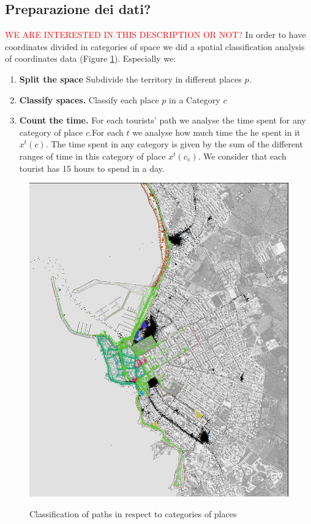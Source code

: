 \documentclass[a4paper]{article}
\begin{document}
\subsection{Preparazione dei dati?}
\textcolor {red}{WE ARE INTERESTED IN THIS DESCRIPTION OR NOT?}
In order to have coordinates divided in categories of space we did a spatial classification analysis of  coordinates data (Figure \ref{10places}). Especially we:
\begin{enumerate}
\item \textbf{Split the space} Subdivide the territory in different places $p$.
\item \textbf{Classify spaces.} Classify each place $p$ in a Category $c$
\item \textbf{Count the time.} For each tourists' path we analyse the time spent for any category of place $c$.For each $t$ we analyse how much time the he spent in it $x^t (c)$. The time spent in any category is given by the sum of the different ranges of time in this category of place $x^t (c_v)$. We consider that each tourist has 15 hours to spend in a day.
\end{enumerate}

\begin{figure}
  \centering
    \includegraphics[width=\textwidth]{10places}\\
  \caption{Classification of paths in respect to categories of places}\label{10places}
\end{figure}
\end{document}
